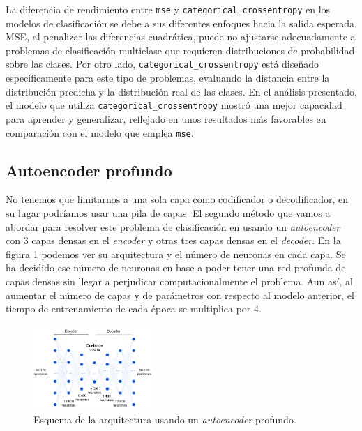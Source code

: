 La diferencia de rendimiento entre \lstinline|mse| y \lstinline|categorical_crossentropy| en los modelos de clasificación se debe a sus diferentes enfoques hacia la salida esperada. MSE, al penalizar las diferencias cuadrática, puede no ajustarse adecuadamente a problemas de clasificación multiclase que requieren distribuciones de probabilidad sobre las clases. Por otro lado, \lstinline|categorical_crossentropy| está diseñado específicamente para este tipo de problemas, evaluando la distancia entre la distribución predicha y la distribución real de las clases. En el análisis presentado, el modelo que utiliza \lstinline|categorical_crossentropy| mostró una mejor capacidad para aprender y generalizar, reflejado en unos resultados más favorables en comparación con el modelo que emplea \lstinline|mse|.



\subsection{Autoencoder profundo}

No tenemos que limitarnos a una sola capa como codificador o decodificador, en su lugar podríamos usar una pila de capas. El segundo método que vamos a abordar para resolver este problema de clasificación en usando un \textit{autoencoder} con 3 capas densas en el \textit{encoder} y otras tres capas densas en el \textit{decoder}. En la figura \ref{img: daeMMC} podemos ver su arquitectura y el número de neuronas en cada capa. Se ha decidido ese número de neuronas en base a poder tener una red profunda de capas densas sin llegar a perjudicar computacionalmente el problema. Aun así, al aumentar el número de capas y de parámetros con respecto al modelo anterior, el tiempo de entrenamiento de cada época se multiplica por 4. 

\begin{figure}[h]
    \begin{center}
    \includegraphics[width=0.4\textwidth]{img/daeMMC.png}
    \end{center}
    \caption{Esquema de la arquitectura usando un \textit{autoencoder} profundo.}
    \label{img: daeMMC}
\end{figure}


